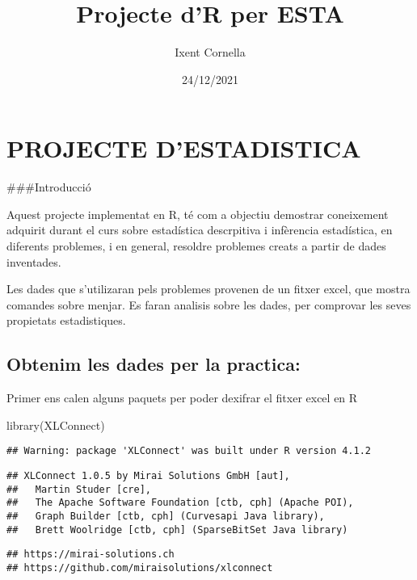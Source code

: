 \documentclass[
]{article}
\title{Projecte d'R per ESTA}
\author{Ixent Cornella}
\date{24/12/2021}
\newenvironment{Shaded}{\begin{snugshade}}{\end{snugshade}}
\newcommand{\FunctionTok}[1]{\textcolor[rgb]{0.00,0.00,0.00}{#1}}
\newcommand{\NormalTok}[1]{#1}
\begin{document}
\maketitle

\hypertarget{projecte-destadistica}{%
\section{PROJECTE D'ESTADISTICA}\label{projecte-destadistica}}

\#\#\#Introducció

Aquest projecte implementat en R, té com a objectiu demostrar
coneixement adquirit durant el curs sobre estadística descrpitiva i
infèrencia estadística, en diferents problemes, i en general, resoldre
problemes creats a partir de dades inventades.

Les dades que s'utilizaran pels problemes provenen de un fitxer excel,
que mostra comandes sobre menjar. Es faran analisis sobre les dades, per
comprovar les seves propietats estadistiques.

\hypertarget{obtenim-les-dades-per-la-practica}{%
\subsection{Obtenim les dades per la
practica:}\label{obtenim-les-dades-per-la-practica}}

Primer ens calen alguns paquets per poder dexifrar el fitxer excel en R

\begin{Shaded}
\begin{Highlighting}[]
  \FunctionTok{library}\NormalTok{(XLConnect)}
\end{Highlighting}
\end{Shaded}

\begin{verbatim}
## Warning: package 'XLConnect' was built under R version 4.1.2
\end{verbatim}

\begin{verbatim}
## XLConnect 1.0.5 by Mirai Solutions GmbH [aut],
##   Martin Studer [cre],
##   The Apache Software Foundation [ctb, cph] (Apache POI),
##   Graph Builder [ctb, cph] (Curvesapi Java library),
##   Brett Woolridge [ctb, cph] (SparseBitSet Java library)
\end{verbatim}

\begin{verbatim}
## https://mirai-solutions.ch
## https://github.com/miraisolutions/xlconnect
\end{verbatim}
\end{document}
